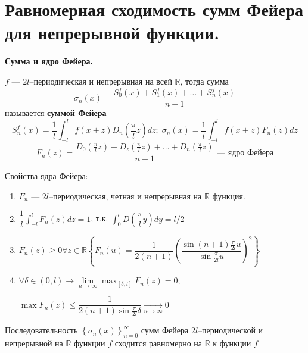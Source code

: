 \section{Равномерная сходимость сумм Фейера для непрерывной функции.}
\textbf{\large Сумма и ядро Фейера.}
\begin{greyDefinition}
	$ f  $ --- $ 2l $--периодическая и непрерывная на всей $ \mathbb{R} $, тогда сумма 
	\[
		\sigma_n(x) = \dfrac{S_0^f(x) + S_1^f(x) + \ldots + S_n^f (x) }{n+1} 
	\]
	называется \textbf{суммой Фейера}
	\[
		S_n^f(x) = \dfrac{1}{l} \int_{-l}^{l} f(x+z)D_n(\dfrac{\pi}{l}z)dz;\; \sigma_n(x) = \dfrac{1}{l} \int_{-l}^{l} f(x+z)F_n(z)dz
	\]
	\[
		F_n(z) = \dfrac{D_0(\frac{\pi}{l}z) + D_z(\frac{\pi}{l}z) + \ldots + D_n(\frac{\pi}{l}z)}{n+1} \text{ --- ядро Фейера}
	\]
\end{greyDefinition}
\begin{greyDefinition}
	Свойства ядра Фейера:\begin{enumerate}
		\item $ F_n $ --- $ 2l $--периодическая, четная и непрерывная на $ \mathbb{R} $ функция.
		\item $ \dfrac{1}{l} \int_{-l}^{l} F_n(z)dz = 1 $, т.к. $ \int_{0}^{l} D(\dfrac{\pi}{l}y)dy = l/2 $
		\item $ F_n(z) \geqslant 0 \forall z \in \mathbb{R} \left\{ F_n(u) = \dfrac{1}{2(n+1)} \left( \dfrac{\sin (n+1)\frac{\pi}{2l}u}{\sin \frac{\pi}{2l}u} \right)^2 \right\}$
		\item $ \forall \delta \in (0,l) \rightarrow \lim\limits_{n \rightarrow \infty} \max_{[\delta,l]} F_n(z) = 0;\;$ 
		
		$ \max F_n(z) \leqslant \dfrac{1}{2(n+1)\sin\frac{\pi}{2l}\delta} \underset{n \rightarrow\infty}{\longrightarrow}0$
	\end{enumerate}
\end{greyDefinition}
\begin{greyTheorem}
	Последовательность $ \left\{ \sigma_n(x) \right\}_{n=0}^\infty $ сумм Фейера $ 2l $--периодической и непрерывной на $ \mathbb{R} $ функции $ f $ сходится равномерно на $ \mathbb{R} $ к функции $ f $
\end{greyTheorem}
